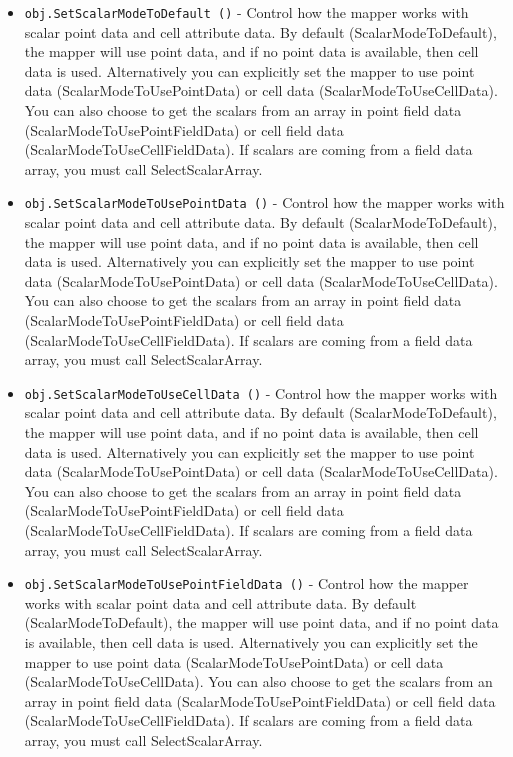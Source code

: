 \begin{itemize}
\item  \verb|obj.SetScalarModeToDefault ()| -  Control how the mapper works with scalar point data and cell attribute
 data.  By default (ScalarModeToDefault), the mapper will use point data,
 and if no point data is available, then cell data is used. Alternatively
 you can explicitly set the mapper to use point data
 (ScalarModeToUsePointData) or cell data (ScalarModeToUseCellData).
 You can also choose to get the scalars from an array in point field
 data (ScalarModeToUsePointFieldData) or cell field data
 (ScalarModeToUseCellFieldData).  If scalars are coming from a field
 data array, you must call SelectScalarArray.

\item  \verb|obj.SetScalarModeToUsePointData ()| -  Control how the mapper works with scalar point data and cell attribute
 data.  By default (ScalarModeToDefault), the mapper will use point data,
 and if no point data is available, then cell data is used. Alternatively
 you can explicitly set the mapper to use point data
 (ScalarModeToUsePointData) or cell data (ScalarModeToUseCellData).
 You can also choose to get the scalars from an array in point field
 data (ScalarModeToUsePointFieldData) or cell field data
 (ScalarModeToUseCellFieldData).  If scalars are coming from a field
 data array, you must call SelectScalarArray.

\item  \verb|obj.SetScalarModeToUseCellData ()| -  Control how the mapper works with scalar point data and cell attribute
 data.  By default (ScalarModeToDefault), the mapper will use point data,
 and if no point data is available, then cell data is used. Alternatively
 you can explicitly set the mapper to use point data
 (ScalarModeToUsePointData) or cell data (ScalarModeToUseCellData).
 You can also choose to get the scalars from an array in point field
 data (ScalarModeToUsePointFieldData) or cell field data
 (ScalarModeToUseCellFieldData).  If scalars are coming from a field
 data array, you must call SelectScalarArray.

\item  \verb|obj.SetScalarModeToUsePointFieldData ()| -  Control how the mapper works with scalar point data and cell attribute
 data.  By default (ScalarModeToDefault), the mapper will use point data,
 and if no point data is available, then cell data is used. Alternatively
 you can explicitly set the mapper to use point data
 (ScalarModeToUsePointData) or cell data (ScalarModeToUseCellData).
 You can also choose to get the scalars from an array in point field
 data (ScalarModeToUsePointFieldData) or cell field data
 (ScalarModeToUseCellFieldData).  If scalars are coming from a field
 data array, you must call SelectScalarArray.


\end{itemize}
